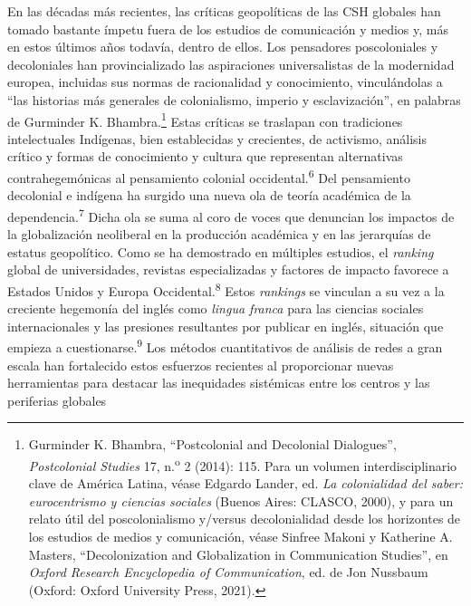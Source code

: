 \documentclass{tufte-handout}
\begin{document}
En las décadas más recientes, las críticas geopolíticas de las CSH
globales han tomado bastante ímpetu fuera de los estudios de
comunicación y medios y, más en estos últimos años todavía, dentro de
ellos. Los pensadores poscoloniales y decoloniales han provincializado
las aspiraciones universalistas de la modernidad europea, incluidas sus
normas de racionalidad y conocimiento, vinculándolas a ``las historias
más generales de colonialismo, imperio y esclavización'', en palabras de
Gurminder K. Bhambra.\footnote{Gurminder K. Bhambra, ``Postcolonial and
  Decolonial Dialogues'', \emph{Postcolonial Studies} 17,
  n.\textsuperscript{o} 2 (2014): 115. Para un volumen
  interdisciplinario clave de América Latina, véase Edgardo Lander, ed.
  \emph{La colonialidad del saber: eurocentrismo y ciencias sociales}
  (Buenos Aires: CLASCO, 2000), y para un relato útil del
  poscolonialismo y/versus decolonialidad desde los horizontes de los
  estudios de medios y comunicación, véase Sinfree Makoni y Katherine A.
  Masters, ``Decolonization and Globalization in Communication
  Studies'', en \emph{Oxford Research Encyclopedia of Communication},
  ed. de Jon Nussbaum (Oxford: Oxford University Press, 2021).} Estas
críticas se traslapan con tradiciones intelectuales Indígenas, bien
establecidas y crecientes, de activismo, análisis crítico y formas de
conocimiento y cultura que representan alternativas contrahegemónicas al
pensamiento colonial occidental.\textsuperscript{6} Del pensamiento decolonial e indígena ha surgido una
nueva ola de teoría académica de la dependencia.\textsuperscript{7}
Dicha ola se suma al coro de voces que denuncian los impactos de la
globalización neoliberal en la producción académica y en las jerarquías
de estatus geopolítico. Como se ha demostrado en múltiples estudios, el
\emph{ranking} global de universidades, revistas especializadas y
factores de impacto favorece a Estados Unidos y Europa
Occidental.\textsuperscript{8} Estos \emph{rankings} se vinculan a su vez a la creciente
hegemonía del inglés como \emph{lingua franca} para las ciencias
sociales internacionales y las presiones resultantes por publicar en
inglés, situación que empieza a cuestionarse.\textsuperscript{9} Los métodos
cuantitativos de análisis de redes a gran escala han fortalecido estos
esfuerzos recientes al proporcionar nuevas herramientas para destacar
las inequidades sistémicas entre los centros y las periferias globales
\end{document}
